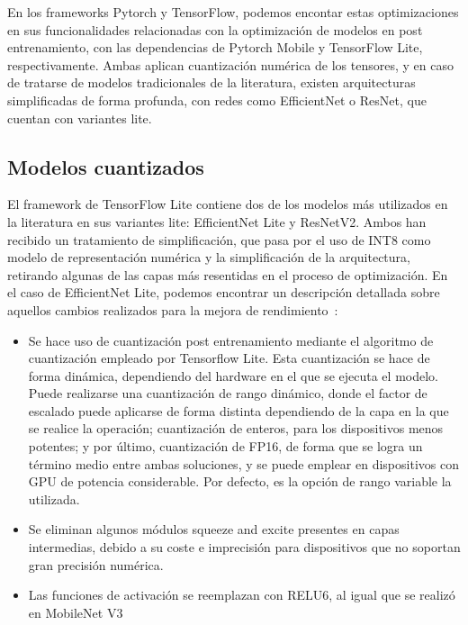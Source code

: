 En los frameworks Pytorch y TensorFlow, podemos encontar estas optimizaciones en sus funcionalidades relacionadas con la optimización de modelos en post entrenamiento, con las dependencias de Pytorch Mobile y TensorFlow Lite, respectivamente. Ambas aplican cuantización numérica de los tensores, y en caso de tratarse de modelos tradicionales de la literatura, existen arquitecturas simplificadas de forma profunda, con redes como EfficientNet o ResNet, que cuentan con variantes lite.

\subsection{Modelos cuantizados}

El framework de TensorFlow Lite contiene dos de los modelos más utilizados en la literatura en sus variantes lite: EfficientNet Lite y ResNetV2. Ambos han recibido un tratamiento de simplificación, que pasa por el uso de INT8 como modelo de representación numérica y la simplificación de la arquitectura, retirando algunas de las capas más resentidas en el proceso de optimización. En el caso de EfficientNet Lite, podemos encontrar un descripción detallada sobre aquellos cambios realizados para la mejora de rendimiento~\cite{eflite2}:

\begin{itemize}
	\item Se hace uso de cuantización post entrenamiento mediante el algoritmo de cuantización empleado por Tensorflow Lite. Esta cuantización se hace de forma dinámica, dependiendo del hardware en el que se ejecuta el modelo. Puede realizarse una cuantización de rango dinámico, donde el factor de escalado puede aplicarse de forma distinta dependiendo de la capa en la que se realice la operación; cuantización de enteros, para los dispositivos menos potentes; y 	por último, cuantización de FP16, de forma que se logra un término medio entre ambas soluciones, y se puede emplear en dispositivos con GPU de potencia considerable. Por defecto, es la opción de rango variable la utilizada.
	\item Se eliminan algunos módulos squeeze and excite presentes en capas intermedias, debido a su coste e imprecisión para dispositivos que no soportan gran precisión numérica.
	\item Las funciones de activación se reemplazan con RELU6, al igual que se realizó en MobileNet V3~\cite {howard2019searching} 
\end{itemize}

